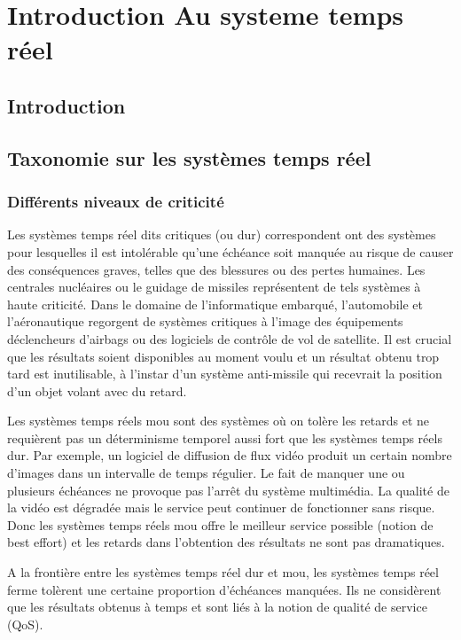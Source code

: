 \chapter{Introduction Au systeme temps réel}
\minitoc
\section{Introduction}
\section{Taxonomie sur les systèmes temps réel}
\subsection*{Différents niveaux de criticité}

Les systèmes temps réel dits critiques (ou dur) correspondent ont des
systèmes pour lesquelles il est intolérable qu’une échéance soit
manquée au risque de causer des conséquences graves, telles que des
blessures ou des pertes humaines. Les centrales nucléaires ou le
guidage de missiles représentent de tels systèmes à haute
criticité. Dans le domaine de l’informatique embarqué, l’automobile et
l’aéronautique regorgent de systèmes critiques à l’image des
équipements déclencheurs d’airbags ou des logiciels de contrôle de vol
de satellite. Il est crucial que les résultats soient disponibles au
moment voulu et un résultat obtenu trop tard est inutilisable, à
l’instar d’un système anti-missile qui recevrait la position d’un
objet volant avec du retard.

Les systèmes temps réels mou sont des systèmes où on tolère les
retards et ne requièrent pas un déterminisme temporel aussi fort que
les systèmes temps réels dur.  Par exemple, un logiciel de diffusion
de flux vidéo produit un certain nombre d’images dans un intervalle de
temps régulier. Le fait de manquer une ou plusieurs échéances ne
provoque pas l’arrêt du système multimédia. La qualité de la vidéo est
dégradée mais le service peut continuer de fonctionner sans
risque. Donc les systèmes temps réels mou offre le meilleur service
possible (notion de best effort) et les retards dans l’obtention des
résultats ne sont pas dramatiques.

A la frontière entre les systèmes temps réel dur et mou, les systèmes
temps réel ferme tolèrent une certaine proportion d’échéances
manquées. Ils ne considèrent que les résultats obtenus à temps et sont
liés à la notion de qualité de service (QoS).

